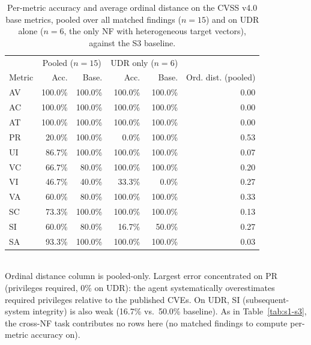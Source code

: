 \begin{table}[t]
\centering
\caption{Per-metric accuracy and average ordinal distance on the CVSS v4.0 base metrics, pooled over all matched findings ($n=15$) and on UDR alone ($n=6$, the only NF with heterogeneous target vectors), against the S3 baseline.}
\label{tab:s2}
\begin{tabular}{lrrrrr}
\toprule
& \multicolumn{2}{c}{Pooled ($n=15$)} & \multicolumn{2}{c}{UDR only ($n=6$)} & \\
Metric & Acc. & Base. & Acc. & Base. & Ord. dist. (pooled) \\
\midrule
AV & 100.0\% & 100.0\% & 100.0\% & 100.0\% & 0.00 \\
AC & 100.0\% & 100.0\% & 100.0\% & 100.0\% & 0.00 \\
AT & 100.0\% & 100.0\% & 100.0\% & 100.0\% & 0.00 \\
PR & 20.0\%  & 100.0\% & 0.0\%   & 100.0\% & 0.53 \\
UI & 86.7\%  & 100.0\% & 100.0\% & 100.0\% & 0.07 \\
VC & 66.7\%  & 80.0\%  & 100.0\% & 100.0\% & 0.20 \\
VI & 46.7\%  & 40.0\%  & 33.3\%  & 0.0\%   & 0.27 \\
VA & 60.0\%  & 80.0\%  & 100.0\% & 100.0\% & 0.33 \\
SC & 73.3\%  & 100.0\% & 100.0\% & 100.0\% & 0.13 \\
SI & 60.0\%  & 80.0\%  & 16.7\%  & 50.0\%  & 0.27 \\
SA & 93.3\%  & 100.0\% & 100.0\% & 100.0\% & 0.03 \\
\bottomrule
\end{tabular}
\\[2pt]
\footnotesize{Ordinal distance column is pooled-only. Largest error concentrated on PR (privileges required, 0\% on UDR): the agent systematically overestimates required privileges relative to the published CVEs. On UDR, SI (subsequent-system integrity) is also weak (16.7\% vs.\ 50.0\% baseline). As in Table~\ref{tab:s1-s3}, the cross-NF task contributes no rows here (no matched findings to compute per-metric accuracy on).}
\end{table}

